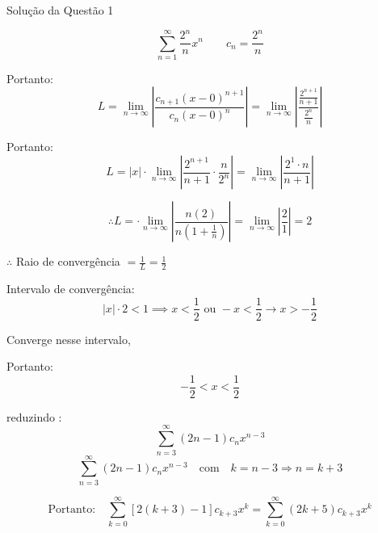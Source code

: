 \documentclass[8pt,aspectratio = 169]{beamer}
\begin{document}
\begin{frame}[allowframebreaks]{Solução da Questão 1}

\[ 
\sum_{n=1}^{\infty} \frac{2^n}{n} x^n \qquad c_n = \frac{2^n}{n} 
\]

Portanto:
\[ 
L =  \lim_{n \to \infty} \left| \frac{c_{n+1} (x-0)^{n+1}}{c_n (x-0)^n} \right| = \lim_{n \to \infty} \left| \frac{\frac{2^{n+1}}{n+1}}{\frac{2^n}{n}} \right| 
\]

Portanto:
\[ 
L=|x| \cdot \lim_{n \to \infty} \left| \frac{2^{n+1}}{n+1} \cdot \frac{n}{2^n} \right| =  \lim_{n \to \infty} \left| \frac{2^1 \cdot n}{n+1} \right| 
\]

\[ 
\therefore L= \cdot \lim_{n \to \infty} \left| \frac{n(2)}{n(1 + \frac{1}{n})} \right| =    \lim_{n \to \infty} \left| \frac{2}{1} \right| =  2 
\]

$\therefore$ Raio de convergência $= \frac{1}{L} = \frac{1}{2}$

\framebreak %

Intervalo de convergência:
\[ 
|x| \cdot 2 < 1 \implies x < \frac{1}{2} \text{ ou } -x < \frac{1}{2} \rightarrow x > -\frac{1}{2} 
\]

Converge nesse intervalo,

Portanto:
\[ 
-\frac{1}{2} < x < \frac{1}{2} 
\]

\vspace{0.5cm}
\begin{center}
\end{center}
\vspace{0.5cm}

\framebreak %

reduzindo : \[
\sum_{n=3}^{\infty} (2n - 1)c_n x^{n-3}
\]
\[
\sum_{n=3}^{\infty} (2n - 1) c_n x^{n-3}
\quad \text{com} \quad k = n - 3 \Rightarrow n = k + 3
\]

\[
\text{Portanto:} \quad
\sum_{k=0}^{\infty} [2(k+3) - 1] c_{k+3} x^k
= \sum_{k=0}^{\infty} (2k + 5) c_{k+3} x^k
\]

\end{frame}
\end{document}
